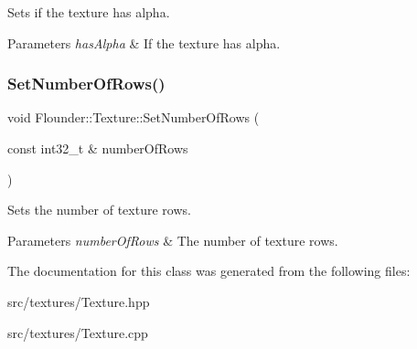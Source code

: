 Sets if the texture has alpha. 


\begin{DoxyParams}{Parameters}
{\em has\+Alpha} & If the texture has alpha. \\
\hline
\end{DoxyParams}
\mbox{\label{class_flounder_1_1_texture_a177ad1438462338b553861919c64c6f7}} 
\subsubsection{\texorpdfstring{Set\+Number\+Of\+Rows()}{SetNumberOfRows()}}
{\footnotesize\ttfamily void Flounder\+::\+Texture\+::\+Set\+Number\+Of\+Rows (\begin{DoxyParamCaption}\item[{const int32\+\_\+t \&}]{number\+Of\+Rows }\end{DoxyParamCaption})\hspace{0.3cm}{\ttfamily [inline]}}



Sets the number of texture rows. 


\begin{DoxyParams}{Parameters}
{\em number\+Of\+Rows} & The number of texture rows. \\
\hline
\end{DoxyParams}


The documentation for this class was generated from the following files\+:\begin{DoxyCompactItemize}
\item 
src/textures/Texture.\+hpp\item 
src/textures/Texture.\+cpp\end{DoxyCompactItemize}
